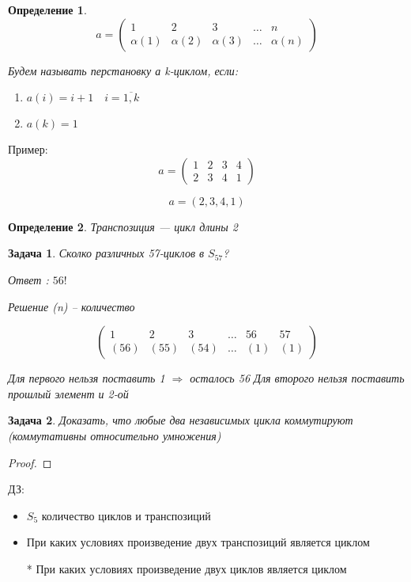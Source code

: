\documentclass[11pt,a4paper]{book}
\newtheorem{Def}{Определение}[chapter]
\newtheorem{Pm}{Задача}[chapter]
\begin{document}
\begin{Def}
$$
a =
\begin{pmatrix}
1 & 2 & 3 & \hdots & n\\
\alpha(1) & \alpha(2) & \alpha(3) & \hdots & \alpha(n)
\end{pmatrix}
$$

Будем называть перстановку а k-циклом, если:
\begin{enumerate}
	\item $a(i) = i+1 \quad i = \overline{1, k}$
	\item $a(k) = 1$ 
\end{enumerate}
\end{Def}

Пример:
$$
a =
\begin{pmatrix}
1 & 2 & 3 & 4\\
2 & 3 & 4 & 1
\end{pmatrix}
$$

$$
a = (2, 3, 4, 1)
$$

\begin{Def}
Транспозиция --- цикл длины 2
\end{Def}

\begin{Pm}
Сколко различных 57-циклов в $S_{57}$?

Ответ : $56!$

Решение
(n) -- количество

$$
\begin{pmatrix}
1& 2 & 3 & \hdots & 56 & 57\\
(56) & (55) & (54)& \hdots & (1) & (1) 
\end{pmatrix}
$$

Для первого нельзя поставить 1 $\Rightarrow$ осталось 56
Для второго нельзя поставить прошлый элемент и 2-ой
\end{Pm}

\begin{Pm}
Доказать, что любые два независимых цикла коммутируют (коммутативны относительно умножения) 
\end{Pm}
\begin{proof}

\end{proof}
ДЗ:
\begin{itemize}
	\item $S_5 $ количество циклов и транспозиций
	\item При каких условиях произведение двух транспозиций является циклом 
	\item[*] При каких условиях произведение двух циклов является циклом
\end{itemize}
\end{document}
